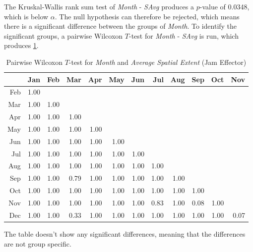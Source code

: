 The Kruskal-Wallis rank sum test of \textit{Month} - \textit{SAvg} produces a $p$-value of 0.0348, which is below $\alpha$. The null hypothesis can therefore be rejected, which means there is a significant difference between the groups of \textit{Month}. To identify the significant groups, a pairwise Wilcoxon $T$-test for \textit{Month} - \textit{SAvg} is run, which produces \cref{tbl:wilcoxon_baysis_effector_Month_SAvg}. 
\begin{table}[ht!]
	\tiny
	\centering
	\begin{tabular}{rrrrrrrrrrrr}
		\toprule
		    & Jan & Feb & Mar & Apr & May & Jun & Jul & Aug & Sep & Oct & Nov \\ 
		\midrule
		Feb & 1.00 &  &  &  &  &  &  &  &  &  &  \\ 
		Mar & 1.00 & 1.00 &  &  &  &  &  &  &  &  &  \\ 
		Apr & 1.00 & 1.00 & 1.00 &  &  &  &  &  &  &  &  \\ 
		May & 1.00 & 1.00 & 1.00 & 1.00 &  &  &  &  &  &  &  \\ 
		Jun & 1.00 & 1.00 & 1.00 & 1.00 & 1.00 &  &  &  &  &  &  \\ 
		Jul & 1.00 & 1.00 & 1.00 & 1.00 & 1.00 & 1.00 &  &  &  &  &  \\ 
		Aug & 1.00 & 1.00 & 1.00 & 1.00 & 1.00 & 1.00 & 1.00 &  &  &  &  \\ 
		Sep & 1.00 & 1.00 & 0.79 & 1.00 & 1.00 & 1.00 & 1.00 & 1.00 &  &  &  \\ 
		Oct & 1.00 & 1.00 & 1.00 & 1.00 & 1.00 & 1.00 & 1.00 & 1.00 & 1.00 &  &  \\ 
		Nov & 1.00 & 1.00 & 1.00 & 1.00 & 1.00 & 1.00 & 0.83 & 1.00 & 0.08 & 1.00 &  \\ 
		Dec & 1.00 & 1.00 & 0.33 & 1.00 & 1.00 & 1.00 & 1.00 & 1.00 & 1.00 & 1.00 & 0.07 \\ 
		\bottomrule
	  \end{tabular}
    \caption{Pairwise Wilcoxon $T$-test for \textit{Month} and \textit{Average Spatial Extent} (Jam Effector)}
    \label{tbl:wilcoxon_baysis_effector_Month_SAvg}
\end{table}
The table doesn't show any significant differences, meaning that the differences are not group specific.
